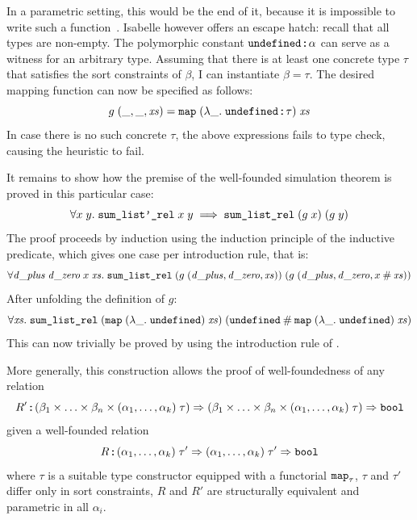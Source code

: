 In a parametric setting, this would be the end of it, because it is impossible to write such a function~\cite{reynolds1983parametric,lochbihler2016probabilistic,gilcher2017parametricity}.
Isabelle however offers an escape hatch: recall that all types are non-empty.
The polymorphic constant $\texttt{\textup{undefined}} \mathbin{:\!\!:} \alpha$ can serve as a witness for an arbitrary type.
Assuming that there is at least one concrete type $\tau$ that satisfies the sort constraints of $\beta$, I can instantiate $\beta = \tau$.
The desired mapping function can now be specified as follows:
\[ g\;(\_, \_, \mathit{xs}) = \texttt{\textup{map}}\;(\lambda \_.\;\texttt{\textup{undefined}} \mathbin{:\!\!:} \tau)\;\mathit{xs} \]
In case there is no such concrete $\tau$, the above expressions fails to type check, causing the heuristic to fail.%

It remains to show how the premise of the well-founded simulation theorem is proved in this particular case:
\[
  \forall x\; y.\; \texttt{\textup{sum\_list'\_rel}}\;x\;y \implies \texttt{\textup{sum\_list\_rel}}\;(g\;x)\;(g\;y)
\]
The proof proceeds by induction using the induction principle of the  inductive predicate, which gives one case per introduction rule, that is:
\[
  \forall \mathit{d\_plus}\;\mathit{d\_zero}\;x\;\mathit{xs}.\;\texttt{\textup{sum\_list\_rel}}\;(g\;(\mathit{d\_plus}, \mathit{d\_zero}, \mathit{xs}))\;(g\;(\mathit{d\_plus}, \mathit{d\_zero}, x \mathbin{\mathtt{\#}} \mathit{xs}))
\]
After unfolding the definition of $g$:
\[
  \forall \mathit{xs}.\;\texttt{\textup{sum\_list\_rel}}\;(\texttt{\textup{map}}\;(\lambda \_.\;\texttt{\textup{undefined}})\;\mathit{xs})\;(\texttt{\textup{undefined}}\mathbin{\mathtt{\#}} \texttt{\textup{map}}\;(\lambda \_.\;\texttt{\textup{undefined}})\;\mathit{xs})
\]
This can now trivially be proved by using the introduction rule of .


\noindent
More generally, this construction allows the proof of well-foundedness of any relation
\[R' \mathbin{:\!\!:} (\beta_1 \times \ldots \times \beta_n \times (\alpha_1, \ldots, \alpha_k)\;\tau) \Rightarrow (\beta_1 \times \ldots \times \beta_n \times (\alpha_1, \ldots, \alpha_k)\;\tau) \Rightarrow \texttt{\textup{bool}}\]
given a well-founded relation
\[R \mathbin{:\!\!:} (\alpha_1, \ldots, \alpha_k)\;\tau' \Rightarrow (\alpha_1, \ldots, \alpha_k)\;\tau' \Rightarrow \texttt{\textup{bool}}
\]
where $\tau$ is a suitable type constructor equipped with a functorial $\texttt{\textup{map}}_\tau$, $\tau$ and $\tau'$ differ only in sort constraints, $R$ and $R'$ are structurally equivalent and parametric in all $\alpha_i$.

